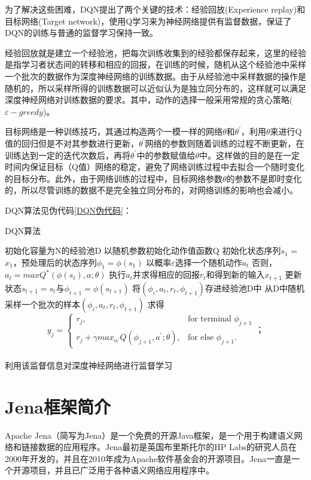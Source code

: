 为了解决这些困难，DQN提出了两个关键的技术：经验回放(Experience replay)和目标网络(Target network)，使用Q学习来为神经网络提供有监督数据，保证了DQN的训练与普通的监督学习保持一致。

经验回放就是建立一个经验池，把每次训练收集到的经验都保存起来，这里的经验是指学习者状态间的转移和相应的回报，在训练的时候，随机从这个经验池中采样一个批次的数据作为深度神经网络的训练数据。由于从经验池中采样数据的操作是随机的，所以采样所得的训练数据可以近似认为是独立同分布的，这样就可以满足深度神经网络对训练数据的要求。其中，动作的选择一般采用常规的贪心策略($\varepsilon-greedy$)。

目标网络是一种训练技巧，其通过构造两个一模一样的网络$\theta$和$\theta^{'}$，利用$\theta$来进行Q值的回归但是不对其参数进行更新，$\theta^{'}$网络的参数则随着训练的过程不断更新，在训练达到一定的迭代次数后，再将$\theta^{'}$中的参数赋值给$\theta$中。这样做的目的是在一定时间内保证目标（Q值）网络的稳定，避免了网络训练过程中去拟合一个随时变化的目标分布。此外，由于网络训练的过程中，目标网络参数$\theta$的参数不是即时变化的，所以尽管训练的数据不是完全独立同分布的，对网络训练的影响也会减小。

DQN算法见伪代码\ref{DQN伪代码}：
\begin{algorithm}
    \caption{DQN算法}
    \label{DQN伪代码}    
    初始化容量为N的经验池D\;
    以随机参数初始化动作值函数Q\;
    {
        初始化状态序列$s_1$ = {$x_1$}，预处理后的状态序列$\phi_1 = \phi(s_1) $\;
        {
            以概率$\varepsilon$选择一个随机动作$a_t$\;
            否则，$a_t = maxQ^*(\phi(s_t),a;\theta)$\;
            执行$a_t$并求得相应的回报$r_t$和得到新的输入$x_{t+1}$\;
            更新状态$s_{t+1}=s_t$与$\phi_{t+1} = \phi(s_{t+1})$\;
            将$(\phi_i,a_t,r_t,\phi_{t+1})$存进经验池D中\;
            从D中随机采样一个批次的样本$(\phi_i,a_t,r_t,\phi_{t+1})$\;
            求得
            \[
                y_j = \begin{cases}
                    r_j,& \text{for terminal }\phi_{j+1}\\
                    r_j+\gamma max_{\alpha^{'}}Q(\phi_{j+1},a^{'};\theta), & \text{for else } \phi_{j+1}.
                \end{cases}；
            \]\\
            利用该监督信息对深度神经网络进行监督学习\;
        }            
    }
\end{algorithm} 

\section{Jena框架简介}
Apache Jena（简写为Jena）是一个免费的开源Java框架，是一个用于构建语义网络和链接数据的应用程序。Jena最初是英国布里斯托尔的HP Labs的研究人员在2000年开发的，并且在2010年成为Apache软件基金会的开源项目。Jena一直是一个开源项目，并且已广泛用于各种语义网络应用程序中。

